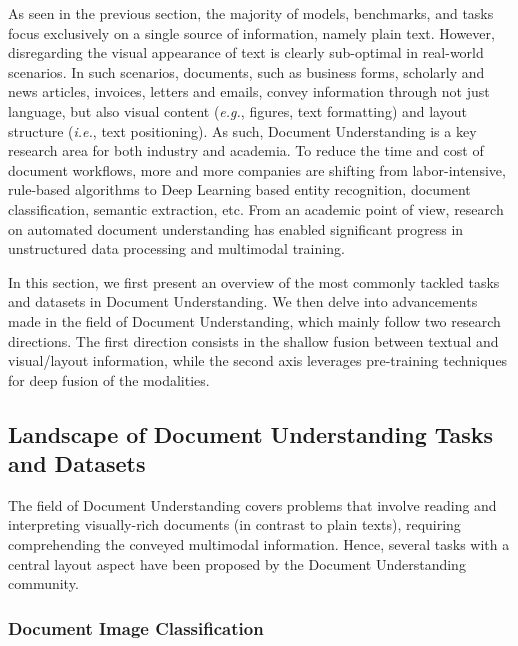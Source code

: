 As seen in the previous section, the majority of models, benchmarks, and tasks focus exclusively on a single source of information, namely plain text. However, disregarding the visual appearance of text is clearly sub-optimal in real-world scenarios. In such scenarios, documents, such as business forms, scholarly and news articles, invoices, letters and emails, convey information through not just language, but also visual content (\textit{e.g.}, figures, text formatting) and layout structure (\textit{i.e.}, text positioning). As such, Document Understanding is a key research area for both industry and academia. To reduce the time and cost of document workflows, more and more companies are shifting from labor-intensive, rule-based algorithms to Deep Learning based entity recognition, document classification, semantic extraction, etc. From an academic point of view, research on automated document understanding has enabled significant progress in unstructured data processing and multimodal training. 


In this section, we first present an overview of the most commonly tackled tasks and datasets in Document Understanding. We then delve into advancements made in the field of Document Understanding, which mainly follow two research directions. The first direction consists in the shallow fusion between textual and visual/layout information, while the second axis leverages pre-training techniques for deep fusion of the modalities.


\subsection{Landscape of Document Understanding Tasks and Datasets}

The field of Document Understanding covers problems that involve reading and interpreting visually-rich documents (in contrast to plain texts), requiring comprehending the conveyed multimodal information. Hence, several tasks with a central layout aspect have been proposed by the Document Understanding community.

\subsubsection{Document Image Classification}

